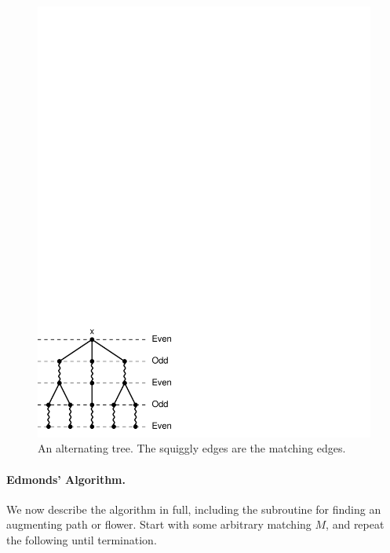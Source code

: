 \documentclass[12pt]{article}
\begin{document}
\begin{figure}[htbp]
\begin{center}
\includegraphics{../figures/evenodd}
\end{center}
\caption{\label{alttree} An alternating tree. The squiggly edges are the
matching edges.}
\end{figure}

\paragraph{Edmonds' Algorithm.}
We now describe the algorithm in full, including the subroutine for finding an augmenting path or flower. Start with some arbitrary matching $M$, and repeat the following until termination.\\
 
\end{document}
